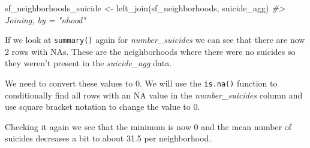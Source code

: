 \documentclass[
  12pt,
]{book}
\newenvironment{Shaded}{\begin{snugshade}}{\end{snugshade}}
\newcommand{\CommentTok}[1]{\textcolor[rgb]{0.37,0.37,0.37}{\textit{#1}}}
\newcommand{\DecValTok}[1]{\textcolor[rgb]{0.06,0.06,0.06}{#1}}
\newcommand{\FunctionTok}[1]{\textcolor[rgb]{0,0,0}{#1}}
\newcommand{\NormalTok}[1]{#1}
\newcommand{\OtherTok}[1]{\textcolor[rgb]{0.37,0.37,0.37}{#1}}
\newcommand{\SpecialCharTok}[1]{\textcolor[rgb]{0,0,0}{#1}}
\begin{document}
\begin{Shaded}
\begin{Highlighting}[]
\NormalTok{sf\_neighborhoods\_suicide }\OtherTok{\textless{}{-}} \FunctionTok{left\_join}\NormalTok{(sf\_neighborhoods, suicide\_agg)}
\CommentTok{\#\textgreater{} Joining, by = "nhood"}
\end{Highlighting}
\end{Shaded}

If we look at \texttt{summary()} again for \emph{number\_suicides} we can see that there are now 2 rows with NAs. These are the neighborhoods where there were no suicides so they weren't present in the \emph{suicide\_agg} data.

\begin{Shaded}
\end{Shaded}

We need to convert these values to 0. We will use the \texttt{is.na()} function to conditionally find all rows with an NA value in the \emph{number\_suicides} column and use square bracket notation to change the value to 0.

\begin{Shaded}
\end{Shaded}

Checking it again we see that the minimum is now 0 and the mean number of suicides decreases a bit to about 31.5 per neighborhood.

\begin{Shaded}
\end{Shaded}
\end{document}
